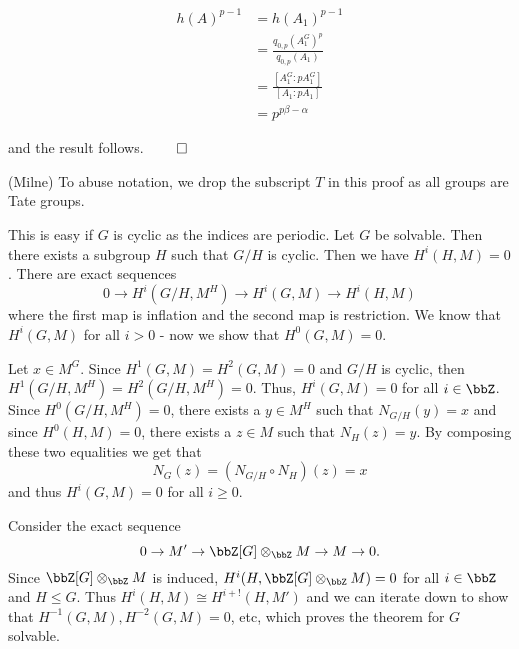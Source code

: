 \documentclass[a4paper, 12pt,oneside,openany]{book}
\begin{document}
\begin{align*}
	h(A)^{p-1} &= h(A_1)^{p-1} \\
	&= \frac{q_{0, p}(A_1^G)^p}{q_{0, p}(A_1)} \\
	&= \frac{[A_1^G: pA_1^G]}{[A_1: pA_1]} \\
	&= p^{p\beta-\alpha}
\end{align*}

and the result follows. $\qed$



 (Milne) To abuse notation, we drop the subscript $T$ in this proof as all groups are Tate groups.  


 This is easy if $G$ is cyclic as the indices are periodic. Let $G$ be solvable. Then there exists a subgroup $H$ such that $G/H$ is cyclic. Then we have $H^i(H, M)=0$. There are exact sequences %
$$0 \to H^i(G/H, M^H) \to H^i(G, M) \to H^i(H, M)$$ where the first map is inflation and the second map is restriction. We know that $H^i(G, M)$ for all $i>0$ - now we show that $H^0(G, M)=0$.

Let $x \in M^G$. Since $H^1(G, M)=H^2(G, M)=0$ and $G/H$ is cyclic, then $H^1(G/H, M^H)=H^2(G/H, M^H)=0$. Thus, $H^i(G, M)=0$ for all $i \in \bbZ$. Since $H^0(G/H, M^H)=0$, there exists a $y \in M^H$ such that $N_{G/H}(y)=x$ and since $H^0(H, M)=0$, there exists a $z \in M$ such that $N_H(z)=y$. By composing these two equalities we get that $$N_G(z)=(N_{G/H} \circ N_H)(z)=x$$ and thus $H^i(G, M)=0$ for all $i \geq 0$.

Consider the exact sequence $$0 \to M' \to \bbZ[G] \otimes_\bbZ M\to M \to 0.$$ Since $\bbZ[G] \otimes_\bbZ M$ is induced, $H^i(H, \bbZ[G] \otimes_\bbZ M)=0$ for all $i \in \bbZ$ and $H \leq G$. Thus $H^i(H, M) \cong H^{i+!}(H, M')$ and we can iterate down to show that $H^{-1}(G, M), H^{-2}(G, M)=0$, etc, which proves the theorem for $G$ solvable.
\end{document}
